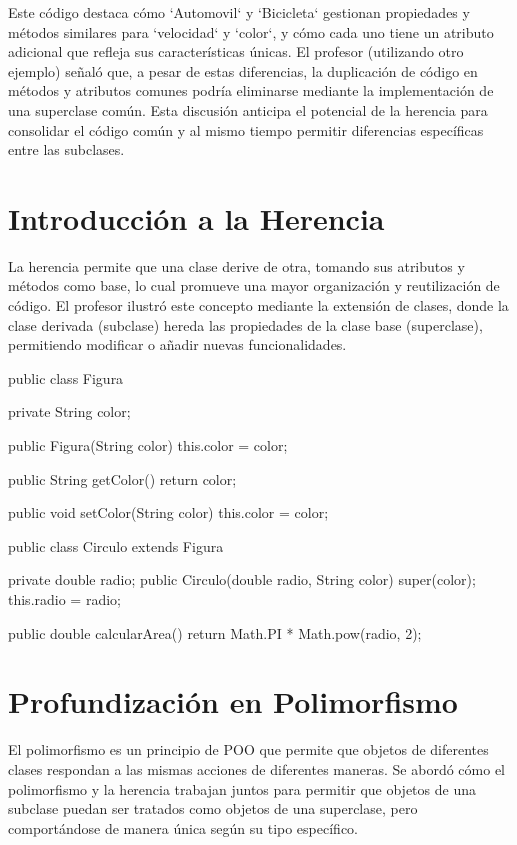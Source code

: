 \documentclass[a4paper]{report}
\begin{document}
Este código destaca cómo `Automovil` y `Bicicleta` gestionan propiedades y métodos similares para `velocidad` y `color`, y cómo cada uno tiene un atributo adicional que refleja sus características únicas. El profesor (utilizando otro ejemplo) señaló que, a pesar de estas diferencias, la duplicación de código en métodos y atributos comunes podría eliminarse mediante la implementación de una superclase común. Esta discusión anticipa el potencial de la herencia para consolidar el código común y al mismo tiempo permitir diferencias específicas entre las subclases.


\section{Introducción a la Herencia}
La herencia permite que una clase derive de otra, tomando sus atributos y métodos como base, lo cual promueve una mayor organización y reutilización de código. El profesor ilustró este concepto mediante la extensión de clases, donde la clase derivada (subclase) hereda las propiedades de la clase base (superclase), permitiendo modificar o añadir nuevas funcionalidades.

\begin{roundedlst}
public class Figura {
    private String color;

    public Figura(String color) {
        this.color = color;
    }

    public String getColor() {
        return color;
    }

    public void setColor(String color) {
        this.color = color;
    }
}


public class Circulo extends Figura {
    private double radio;
    public Circulo(double radio, String color) {
        super(color);
        this.radio = radio;
    }

    public double calcularArea() {
        return Math.PI * Math.pow(radio, 2);
    }
}
\end{roundedlst}

\section{Profundización en Polimorfismo}
El polimorfismo es un principio de POO que permite que objetos de diferentes clases respondan a las mismas acciones de diferentes maneras. Se abordó cómo el polimorfismo y la herencia trabajan juntos para permitir que objetos de una subclase puedan ser tratados como objetos de una superclase, pero comportándose de manera única según su tipo específico.
\end{document}
